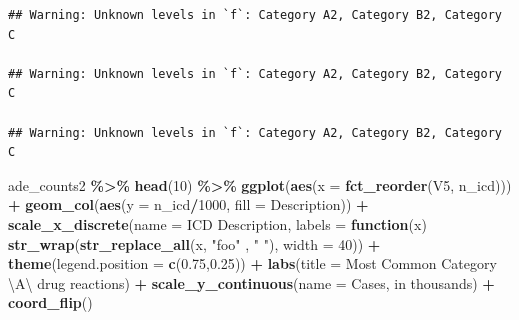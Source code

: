 \documentclass[preprint, 3p,
authoryear]{elsarticle} %
\newenvironment{Shaded}{\begin{snugshade}}{\end{snugshade}}
\newcommand{\CharTok}[1]{\textcolor[rgb]{0.31,0.60,0.02}{#1}}
\newcommand{\ControlFlowTok}[1]{\textcolor[rgb]{0.13,0.29,0.53}{\textbf{#1}}}
\newcommand{\DataTypeTok}[1]{\textcolor[rgb]{0.13,0.29,0.53}{#1}}
\newcommand{\DecValTok}[1]{\textcolor[rgb]{0.00,0.00,0.81}{#1}}
\newcommand{\FloatTok}[1]{\textcolor[rgb]{0.00,0.00,0.81}{#1}}
\newcommand{\KeywordTok}[1]{\textcolor[rgb]{0.13,0.29,0.53}{\textbf{#1}}}
\newcommand{\NormalTok}[1]{#1}
\newcommand{\OperatorTok}[1]{\textcolor[rgb]{0.81,0.36,0.00}{\textbf{#1}}}
\newcommand{\StringTok}[1]{\textcolor[rgb]{0.31,0.60,0.02}{#1}}
\begin{document}
\begin{verbatim}
## Warning: Unknown levels in `f`: Category A2, Category B2, Category C

## Warning: Unknown levels in `f`: Category A2, Category B2, Category C

## Warning: Unknown levels in `f`: Category A2, Category B2, Category C
\end{verbatim}

\begin{Shaded}
\begin{Highlighting}[]
\NormalTok{ade\_counts2 }\OperatorTok{\%\textgreater{}\%}
\StringTok{  }\KeywordTok{head}\NormalTok{(}\DecValTok{10}\NormalTok{) }\OperatorTok{\%\textgreater{}\%}
\StringTok{  }\KeywordTok{ggplot}\NormalTok{(}\KeywordTok{aes}\NormalTok{(}\DataTypeTok{x =} \KeywordTok{fct\_reorder}\NormalTok{(V5, n\_icd))) }\OperatorTok{+}
\StringTok{  }\KeywordTok{geom\_col}\NormalTok{(}\KeywordTok{aes}\NormalTok{(}\DataTypeTok{y =}\NormalTok{ n\_icd}\OperatorTok{/}\DecValTok{1000}\NormalTok{, }\DataTypeTok{fill =}\NormalTok{ Description)) }\OperatorTok{+}\StringTok{ }
\StringTok{  }\KeywordTok{scale\_x\_discrete}\NormalTok{(}\DataTypeTok{name =} \StringTok{\textquotesingle{}ICD Description\textquotesingle{}}\NormalTok{, }\DataTypeTok{labels =} \ControlFlowTok{function}\NormalTok{(x) }\KeywordTok{str\_wrap}\NormalTok{(}\KeywordTok{str\_replace\_all}\NormalTok{(x, }\StringTok{"foo"}\NormalTok{ , }\StringTok{" "}\NormalTok{),}
                                                 \DataTypeTok{width =} \DecValTok{40}\NormalTok{)) }\OperatorTok{+}
\StringTok{  }\KeywordTok{theme}\NormalTok{(}\DataTypeTok{legend.position =} \KeywordTok{c}\NormalTok{(}\FloatTok{0.75}\NormalTok{,}\FloatTok{0.25}\NormalTok{)) }\OperatorTok{+}
\StringTok{  }\KeywordTok{labs}\NormalTok{(}\DataTypeTok{title =} \StringTok{\textquotesingle{}Most Common Category }\CharTok{\textbackslash{}\textquotesingle{}}\StringTok{A}\CharTok{\textbackslash{}\textquotesingle{}}\StringTok{ drug reactions\textquotesingle{}}\NormalTok{) }\OperatorTok{+}
\StringTok{  }\KeywordTok{scale\_y\_continuous}\NormalTok{(}\DataTypeTok{name =} \StringTok{\textquotesingle{}Cases, in thousands\textquotesingle{}}\NormalTok{) }\OperatorTok{+}
\StringTok{  }\KeywordTok{coord\_flip}\NormalTok{() }
\end{Highlighting}
\end{Shaded}
\end{document}
